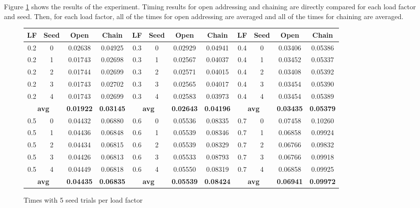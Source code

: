 \documentclass{article}
\begin{document}
Figure \ref{tab:5_seeds} shows the results of the experiment.  Timing results for open addressing and chaining are directly compared for each load factor and seed.  Then, for each load factor, all of the times for open addressing are averaged and all of the times for chaining are averaged.
\begin{figure}[H]
\centering
\begin{tabular}{|cccc|cccc|cccc|}\hline
LF & Seed & Open & Chain & LF & Seed & Open & Chain & LF & Seed & Open & Chain  \\ \hline
0.2 & 0 & 0.02638 & 0.04925 & 0.3 & 0 & 0.02929 & 0.04941 & 0.4 & 0 & 0.03406 & 0.05386 \\
0.2 & 1 & 0.01743 & 0.02698 & 0.3 & 1 & 0.02567 & 0.04037 & 0.4 & 1 & 0.03452 & 0.05337 \\
0.2 & 2 & 0.01744 & 0.02699 & 0.3 & 2 & 0.02571 & 0.04015 & 0.4 & 2 & 0.03408 & 0.05392 \\
0.2 & 3 & 0.01743 & 0.02702 & 0.3 & 3 & 0.02565 & 0.04017 & 0.4 & 3 & 0.03454 & 0.05390 \\
0.2 & 4 & 0.01743 & 0.02699 & 0.3 & 4 & 0.02583 & 0.03973 & 0.4 & 4 & 0.03454 & 0.05389 \\
\multicolumn{2}{|c}{\textbf{avg}} & \textbf{0.01922} & \textbf{0.03145} & \multicolumn{2}{|c}{\textbf{avg}} & \textbf{0.02643} & \textbf{0.04196} & \multicolumn{2}{|c}{\textbf{avg}} & \textbf{0.03435} & \textbf{0.05379} \\ \hline
0.5 & 0 & 0.04432 & 0.06880 & 0.6 & 0 & 0.05536 & 0.08335 & 0.7 & 0 & 0.07458 & 0.10260 \\
0.5 & 1 & 0.04436 & 0.06848 & 0.6 & 1 & 0.05539 & 0.08346 & 0.7 & 1 & 0.06858 & 0.09924 \\
0.5 & 2 & 0.04434 & 0.06815 & 0.6 & 2 & 0.05539 & 0.08329 & 0.7 & 2 & 0.06766 & 0.09832 \\
0.5 & 3 & 0.04426 & 0.06813 & 0.6 & 3 & 0.05533 & 0.08793 & 0.7 & 3 & 0.06766 & 0.09918 \\
0.5 & 4 & 0.04449 & 0.06818 & 0.6 & 4 & 0.05550 & 0.08319 & 0.7 & 4 & 0.06858 & 0.09925 \\
\multicolumn{2}{|c}{\textbf{avg}} & \textbf{0.04435} & \textbf{0.06835} & \multicolumn{2}{|c}{\textbf{avg}} & \textbf{0.05539} & \textbf{0.08424} & \multicolumn{2}{|c}{\textbf{avg}} & \textbf{0.06941} & \textbf{0.09972} \\ \hline
\end{tabular}
\caption{Times with 5 seed trials per load factor}
\label{tab:5_seeds}
\end{figure}
\end{document}
